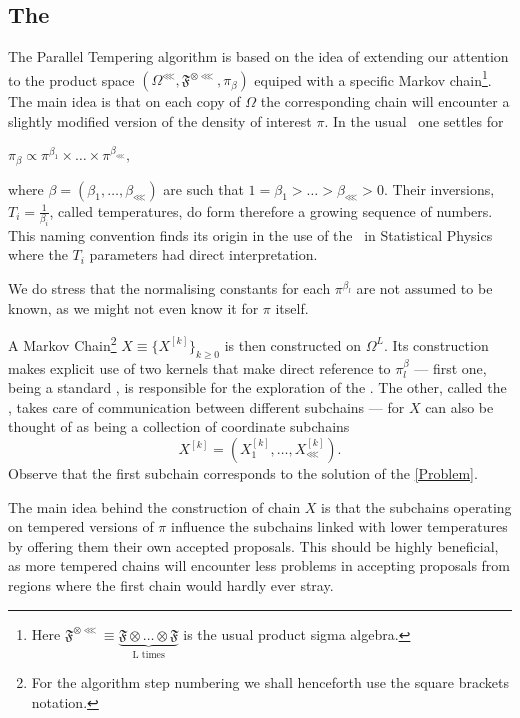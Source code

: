 \documentclass{article}
\begin{document}
\subsection*{The \PT} 
The Parallel Tempering algorithm is based on the idea of extending our attention to the product space $(\Omega^\lll, \mathfrak{F}^{\otimes \lll}, \pi_\beta)$ equiped with a specific Markov chain\footnote{Here $\mathfrak{F}^{\otimes \lll} \equiv \underbrace{\mathfrak{F} \otimes \dots \otimes \mathfrak{F}}_{\text{L times}}$ is the usual product sigma algebra.}. The main idea is that on each copy of $\Omega$ the corresponding chain will encounter a slightly modified version of the density of interest $\pi$. In the usual \PT\, one settles for 

\begin{assumptions}
	\item $\pi_\beta \propto \pi^{\beta_1} \times \dots \times \pi^{\beta_\lll},$\label{product form}
\end{assumptions}	

where $\beta = (\beta_1 , \dots , \beta_\lll)$ are such that $1 = \beta_1 > \dots > \beta_\lll > 0$. Their inversions, $T_i = \frac{1}{\beta_i}$, called temperatures, do form therefore a growing sequence of numbers. This naming convention finds its origin in the use of the \PT\, in Statistical Physics where the $T_i$ parameters had direct interpretation. 

We do stress that the normalising constants for each $\pi^{\beta_l}$ are not assumed to be known, as we might not even know it for $\pi$ itself.

A Markov Chain\footnote{For the algorithm step numbering we shall henceforth use the square brackets notation.} $X \equiv \{ X^{[k]}\}_{k \geq 0}$ is then constructed on $\Omega^L$. Its construction makes explicit use of two kernels that make direct reference to $\pi^\beta_l$ --- first one, being a standard \randomWalk, is responsible for the exploration of the \sspace. The other, called the \swapStep, takes care of communication between different subchains ---  for $X$ can also be thought of as being a collection of coordinate subchains 
$$X^{[k]} = (X_1^{[k]}, \dots, X_\lll^{[k]}).$$
Observe that the first subchain corresponds to the solution of the \ref{Problem}.

The main idea behind the construction of chain $X$ is that the subchains operating on tempered versions of $\pi$ influence the subchains linked with lower temperatures by offering them their own accepted proposals. This should be highly beneficial, as more tempered chains will encounter less problems in accepting proposals from regions where the first chain would hardly ever stray.  
\end{document}
